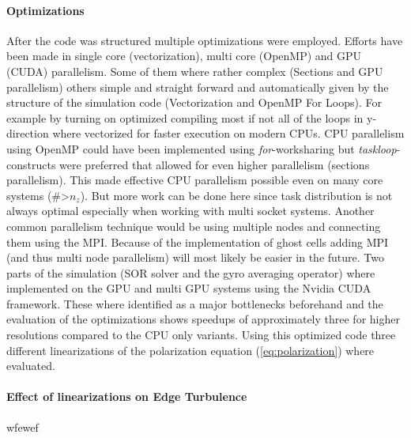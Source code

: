 \documentclass[master.tex]{subfiles}
\begin{document}
\paragraph{Optimizations}
After the code was structured multiple optimizations were employed. Efforts have been made in single core (vectorization), multi core (OpenMP) and GPU (CUDA) parallelism. Some of them where rather complex (Sections and GPU parallelism) others simple and straight forward and automatically given by the structure of the simulation code (Vectorization and OpenMP For Loops). For example by turning on optimized compiling most if not all of the loops in y-direction where vectorized for faster execution on modern CPUs.\newline
CPU parallelism using OpenMP could have been implemented using \textit{for}-worksharing but \textit{taskloop}-constructs were preferred that allowed for even higher parallelism (sections parallelism). This made effective CPU parallelism possible even on many core systems (\#>$n_z$). But more work can be done here since task distribution is not always optimal especially when working with multi socket systems. Another common parallelism technique would be using multiple nodes and connecting them using the \ac{MPI}. Because of the implementation of ghost cells adding \ac{MPI} (and thus multi node parallelism) will most likely be easier in the future.\newline
Two parts of the simulation (\ac{SOR} solver and the gyro averaging operator) where implemented on the GPU and multi GPU systems using the Nvidia CUDA framework. These where identified as a major bottlenecks beforehand and the evaluation of the optimizations shows speedups of approximately three for higher resolutions compared to the CPU only variants. Using this optimized code three different linearizations of the polarization equation (\autoref{eq:polarization}) where evaluated.

\paragraph{Effect of linearizations on Edge Turbulence}


wfewef
\end{document}
